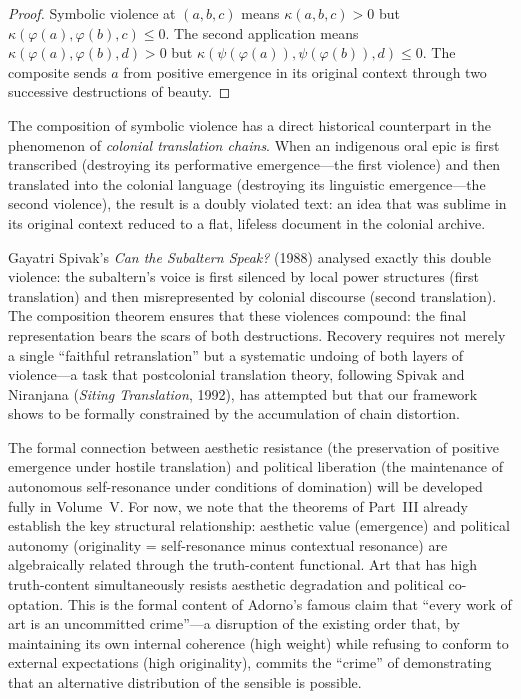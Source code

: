 \begin{proof}
Symbolic violence at $(a, b, c)$ means $\kappa(a, b, c) > 0$ but $\kappa(\varphi(a), \varphi(b), c) \leq 0$.  The second application means $\kappa(\varphi(a), \varphi(b), d) > 0$ but $\kappa(\psi(\varphi(a)), \psi(\varphi(b)), d) \leq 0$.  The composite sends $a$ from positive emergence in its original context through two successive destructions of beauty.
\end{proof}

\begin{interpretation}
\label{interp:colonial-translation}
The composition of symbolic violence has a direct historical counterpart in the phenomenon of \emph{colonial translation chains}.  When an indigenous oral epic is first transcribed (destroying its performative emergence---the first violence) and then translated into the colonial language (destroying its linguistic emergence---the second violence), the result is a doubly violated text: an idea that was sublime in its original context reduced to a flat, lifeless document in the colonial archive.

Gayatri Spivak's \textit{Can the Subaltern Speak?} (1988) analysed exactly this double violence: the subaltern's voice is first silenced by local power structures (first translation) and then misrepresented by colonial discourse (second translation).  The composition theorem ensures that these violences compound: the final representation bears the scars of both destructions.  Recovery requires not merely a single ``faithful retranslation'' but a systematic undoing of both layers of violence---a task that postcolonial translation theory, following Spivak and Niranjana (\textit{Siting Translation}, 1992), has attempted but that our framework shows to be formally constrained by the accumulation of chain distortion.
\end{interpretation}

\begin{remark}
The formal connection between aesthetic resistance (the preservation of positive emergence under hostile translation) and political liberation (the maintenance of autonomous self-resonance under conditions of domination) will be developed fully in Volume~V.  For now, we note that the theorems of Part~III already establish the key structural relationship: aesthetic value (emergence) and political autonomy (originality = self-resonance minus contextual resonance) are algebraically related through the truth-content functional.  Art that has high truth-content simultaneously resists aesthetic degradation and political co-optation.  This is the formal content of Adorno's famous claim that ``every work of art is an uncommitted crime''---a disruption of the existing order that, by maintaining its own internal coherence (high weight) while refusing to conform to external expectations (high originality), commits the ``crime'' of demonstrating that an alternative distribution of the sensible is possible.
\end{remark}

